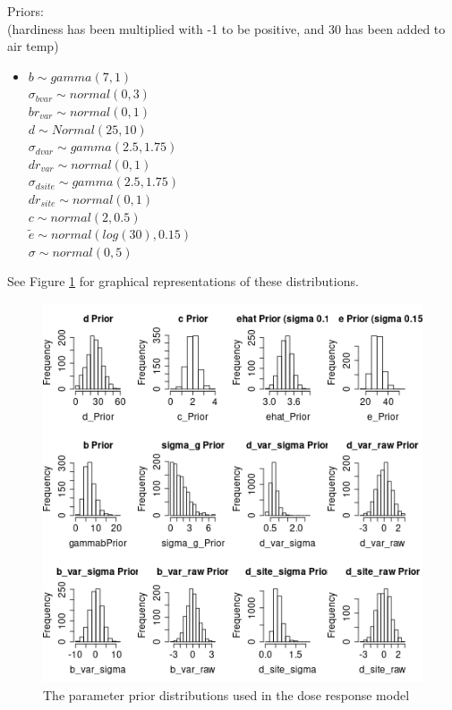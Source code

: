 \documentclass[11pt,letter]{article}
\begin{document}
Priors:\\
(hardiness has been multiplied with -1 to be positive, and 30 has been added to air temp)
\begin{itemize}
\item[]$b \sim gamma(7,1)$\\
$\sigma_{bvar} \sim normal(0,3)$ \\
$br_{var} \sim normal(0,1)$ \\
$d \sim Normal(25, 10)$ \\
$\sigma_{dvar} \sim gamma(2.5,1.75)$ \\
$dr_{var} \sim normal(0,1)$ \\
$\sigma_{dsite} \sim gamma(2.5,1.75)$ \\
$dr_{site} \sim normal(0,1)$ \\
$c \sim normal(2,0.5)$\\
$\tilde{e} \sim normal(log(30), 0.15)$ \\
$\sigma \sim normal(0,5)$\\
\end{itemize}

See Figure \ref{fig:parameters} for graphical representations of these distributions. \\

\begin{figure}
  \includegraphics[scale = 1]{Priors.png}
  \caption{The parameter prior distributions used in the dose response model}
  \label{fig:parameters}
\end{figure}
\end{document}
